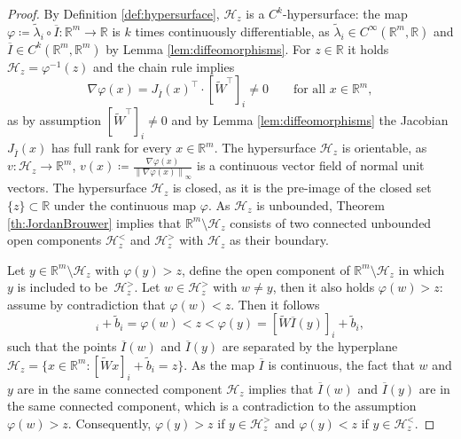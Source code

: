 \documentclass[10pt]{article}
\numberwithin{equation}{section}
\newcommand\norm[1]{\left\lVert#1\right\rVert}
\begin{document}
	\begin{proof}
		By Definition \ref{def:hypersurface}, $\mathcal{H}_z$ is a $C^k$-hypersurface: the map $\varphi\coloneqq \tilde\lambda_i\circ\overline{I}: \mathbb{R}^m\rightarrow\mathbb{R}$ is $k$ times continuously differentiable, as $\tilde\lambda_i\in C^\infty(\mathbb{R}^m,\mathbb{R})$ and   $\overline{I}\in C^k(\mathbb{R}^m,\mathbb{R}^m)$ by Lemma \ref{lem:diffeomorphisms}. For $z\in\mathbb{R}$ it holds $\mathcal{H}_z=\varphi^{-1}(z)$ and the chain rule implies
		\begin{equation*}
			\nabla \varphi(x)= J_{\overline{I}}(x)^\top \cdot [\widetilde{W}^\top]_i \neq 0 \qquad \text{for all } x \in \mathbb{R}^m,
		\end{equation*}
		as by assumption $[\widetilde{W}^\top]_i \neq 0$ and by Lemma \ref{lem:diffeomorphisms} the Jacobian $J_{\overline{I}}(x)$ has  full rank for every $x \in \mathbb{R}^m$. The hypersurface $\mathcal{H}_z$ is orientable, as $v:\mathcal{H}_z\rightarrow \mathbb{R}^m$, $v(x) \coloneqq \frac{\nabla \varphi(x)}{\norm{\nabla \varphi(x)}_\infty}$ is a continuous vector field of normal unit vectors. The hypersurface $\mathcal{H}_z$ is closed, as it is the pre-image of the closed set $\{z\}\subset \mathbb{R}$ under the continuous map $\varphi$. As $\mathcal{H}_z$ is unbounded, Theorem \ref{th:JordanBrouwer} implies that $\mathbb{R}^m\setminus \mathcal{H}_z$ consists of two connected unbounded open components $\mathcal{H}_z^{<}$ and $\mathcal{H}_z^{>}$ with $\mathcal{H}_z$ as their boundary.
		
		Let $y \in \mathbb{R}^m\setminus \mathcal{H}_z$ with $\varphi(y)>z$, define the open component of $ \mathbb{R}^m\setminus \mathcal{H}_z$ in which $y$ is included to be~$\mathcal{H}_z^{>}$. Let $w\in \mathcal{H}_z^{>}$ with $w \neq y$, then it also holds  $\varphi(w)>z$: assume by contradiction that  $\varphi(w)<z$. Then it follows
		\begin{equation*}
			[\widetilde{W}\overline{I}(w)]_i+\tilde{b}_i = \varphi(w)<z<\varphi(y) = 	[\widetilde{W}\overline{I}(y)]_i+\tilde{b}_i,
		\end{equation*}
		such that the points  $\overline{I}(w)$ and $\overline{I}(y)$ are separated by the hyperplane $\mathcal{H}_z = \{x \in \mathbb{R}^m: [\widetilde{W}x]_i + \tilde{b}_i= z\}$. As the map $\overline{I}$ is continuous, the fact that $w$ and $y$ are in the same connected component $\mathcal{H}_z$ implies that  $\overline{I}(w)$ and $\overline{I}(y)$ are in the same connected component, which is a contradiction to the assumption  $\varphi(w)>z$. Consequently, $\varphi(y)>z$ if $y \in \mathcal{H}_z^>$ and $\varphi(y)<z$ if $y \in \mathcal{H}_z^<$.
	\end{proof}
	
\end{document}

